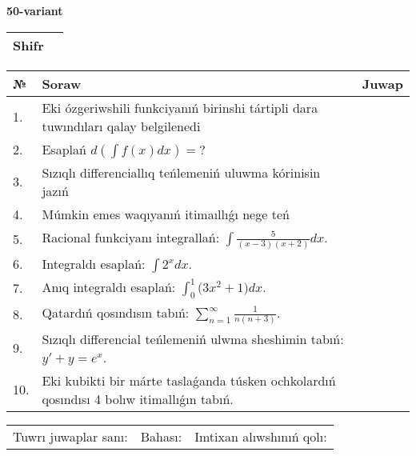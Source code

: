 \documentclass{article}
\begin{document}
  \egroup
  
  \newpage
  
  
  \textbf{50-variant}\\
  
  \bgroup
  \def\arraystretch{1.6} %
  
  \begin{tabular}{|m{5.7cm}|m{9.5cm}|}
  \hline
  Shifr & \\
  \hline
  \end{tabular}
  
  \vspace{1cm}
  
  \begin{tabular}{|m{0.7cm}|m{10cm}|m{4cm}|}
  \hline
  № & Soraw & Juwap \\
  \hline
  1. & Eki ózgeriwshili funkciyanıń birinshi tártipli dara tuwındıları qalay belgilenedi &  \\
  \hline
  2. & Esaplań \(d\left( \int{f(x)dx} \right) = ?\) &  \\
  \hline
  3. & Sızıqlı differenciallıq teńlemeniń uluwma kórinisin jazıń &  \\
  \hline
  4. & Múmkin emes waqıyanıń itimaıllıǵı nege teń &  \\
  \hline
  5. & Racional funkciyanı integrallań: \(\int{\frac{5}{(x - 3)(x + 2)}dx}\). &  \\
  \hline
  6. & Integraldı esaplań: \(\int{2^{x}dx}\). &  \\
  \hline
  7. & Anıq integraldı esaplań: \(\int_{0}^{1}{(3x^2 } + 1)dx\). &  \\
  \hline
  8. & Qatardıń qosındısın tabıń: \(\sum_{n = 1}^{\infty}\frac{1}{n(n + 3)}\). &  \\
  \hline
  9. & Sızıqlı differencial teńlemeniń ulwma sheshimin tabıń: \(y' + y = e^{x}\). &  \\
  \hline
  10. & Eki kubikti bir márte taslaǵanda túsken ochkolardıń qosındısı 4 bolıw itimallıǵın tabıń. &  \\
  \hline
  \end{tabular}
  
  \vspace{1cm}
  
  \begin{tabular}{lll}
  Tuwrı juwaplar sanı: \underline{\hspace{1.5cm}} & 
  Bahası: \underline{\hspace{1.5cm}} & 
  Imtixan alıwshınıń qolı: \underline{\hspace{2cm}} \\
  \end{tabular}
  
\end{document}
